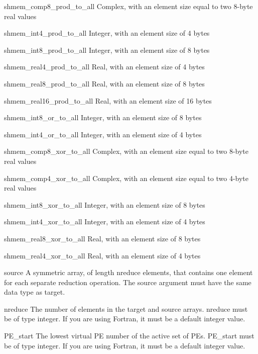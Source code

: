 		    shmem_comp8_prod_to_all	  Complex,  with  an   element
						  size	equal  to  two	8-byte
						  real values

		    shmem_int4_prod_to_all	  Integer,  with  an   element
						  size of 4 bytes

		    shmem_int8_prod_to_all	  Integer,   with  an  element
						  size of 8 bytes

		    shmem_real4_prod_to_all	  Real, with an	 element  size
						  of 4 bytes

		    shmem_real8_prod_to_all	  Real,	 with  an element size
						  of 8 bytes

		    shmem_real16_prod_to_all	  Real, with an	 element  size
						  of 16 bytes
						  
		    shmem_int8_or_to_all	  Integer,  with  an   element
						  size of 8 bytes

		    shmem_int4_or_to_all	  Integer,   with  an  element
						  size of 4 bytes
						  
		    shmem_comp8_xor_to_all      Complex, with an	 element  size
					       equal to two 8-byte real values

		   shmem_comp4_xor_to_all      Complex, with an	 element  size
					       equal to two 4-byte real values

		   shmem_int8_xor_to_all       Integer, with an	 element  size
					       of 8 bytes

		   shmem_int4_xor_to_all       Integer,	 with  an element size
					       of 4 bytes

		   shmem_real8_xor_to_all      Real, with an element size of 8
					       bytes

		   shmem_real4_xor_to_all      Real, with an element size of 4
					       bytes
					       
						 

       source	    A  symmetric  array,  of  length  nreduce  elements,  that
		    contains   one   element   for   each  separate  reduction
		    operation.	The source argument must have  the  same  data
		    type as target.

       nreduce	    The	 number	 of  elements in the target and source arrays.
		    nreduce must  be  of  type	integer.   If  you  are	 using
		    Fortran, it must be a default integer value.

       PE_start	    The	 lowest	 virtual  PE  number of the active set of PEs.
		    PE_start must be  of  type	integer.   If  you  are	 using
		    Fortran, it must be a default integer value.

